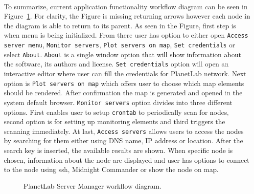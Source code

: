 \paragraph{} To summarize, current application functionality workflow diagram can be seen in Figure~\ref{fig:workflowdiagram}. For clarity, the Figure is missing returning arrows however each node in the diagram is able to return to its parent. As seen in the Figure, first step is when menu is being initialized. From there user has option to either open \texttt{Access server menu}, \texttt{Monitor servers}, \texttt{Plot servers on map}, \texttt{Set credentials} or select \texttt{About}. \texttt{About} is a single window option that will show information about the software, its authors and license. \texttt{Set credentials} option will open an interactive editor where user can fill the credentials for PlanetLab network. Next option is \texttt{Plot servers on map} which offers user to choose which map elements should be rendered. After confirmation the map is generated and opened in the system default browser. \texttt{Monitor servers} option divides into three different options. First enables user to setup \texttt{crontab} to periodically scan for nodes, second option is for setting up monitoring elements and third triggers the scanning immediately. At last, \texttt{Access servers} allows users to access the nodes by searching for them either using DNS name, IP address or location. After the search key is inserted, the available results are shown. When specific node is chosen, information about the node are displayed and user has options to connect to the node using ssh, Midnight Commander or show the node on map.

\begin{figure}[H]
	\centering
	\caption{PlanetLab Server Manager workflow diagram.}
	\label{fig:workflowdiagram}
\end{figure}
 